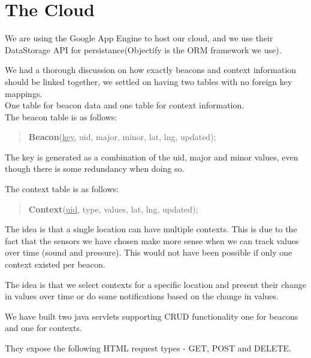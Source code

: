 \section{The Cloud}
We are using the Google App Engine to host our cloud, and we use their DataStorage API for persistance(Objectify is the ORM framework we use).

We had a thorough discussion on how exactly beacons and context information should be linked together, we settled on having two tables with no foreign key mappings.\\
One table for beacon data and one table for context information.\\

The beacon table is as follows:
\begin{quotation}
\textbf{Beacon}(\underline{key}, uid, major, minor, lat, lng, updated);
\end{quotation}
The key is generated as a combination of the uid, major and minor values, even though there is some redundancy when doing so.

The context table is as follows:
\begin{quotation}
\textbf{Context}(\underline{uid}, type, values, lat, lng, updated);
\end{quotation}
The idea is that a single location can have multiple contexts. This is due to the fact that the sensors we have chosen make more sense when we can track values over time (sound and pressure).
This would not have been possible if only one context existed per beacon.

The idea is that we select contexts for a specific location and present their change in values over time or do some notifications based on the change in values.




We have built two java servlets supporting CRUD functionality one for beacons and one for contexts.

They expose the following HTML request types - GET, POST and DELETE.

